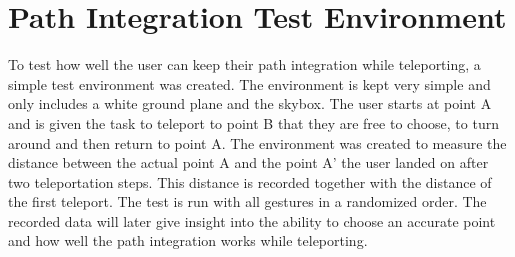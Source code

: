\section{Path Integration Test Environment} %
To test how well the user can keep their path integration while teleporting, a simple test environment was created. The environment is kept very simple and only includes a white ground plane and the skybox. The user starts at point A and is given the task to teleport to point B that they are free to choose, to turn around and then return to point A. The environment was created to measure the distance between the actual point A and the point A' the user landed on after two teleportation steps. This distance is recorded together with the distance of the first teleport. The test is run with all gestures in a randomized order. The recorded data will later give insight into the ability to choose an accurate point and how well the path integration works while teleporting.